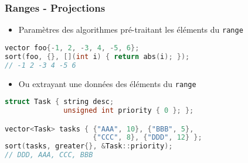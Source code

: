 \documentclass[C++.tex]{subfiles}
\begin{document}
\begin{frame}[fragile]
	\frametitle{Ranges - Projections}
	\begin{itemize}
		\item Paramètres des algorithmes pré-traitant les éléments du \lstinline|range|
	\end{itemize}

	\begin{lstlisting}[language=C++]
vector foo{-1, 2, -3, 4, -5, 6};
sort(foo, {}, [](int i) { return abs(i); }); 
// -1 2 -3 4 -5 6\end{lstlisting}


	\begin{itemize}
		\item Ou extrayant une données des éléments du \lstinline|range|
	\end{itemize}

	\begin{lstlisting}[language=C++]
struct Task { string desc;
              unsigned int priority { 0 }; };

vector<Task> tasks { {"AAA", 10}, {"BBB", 5}, 
                     {"CCC", 8}, {"DDD", 12} };
sort(tasks, greater{}, &Task::priority);
// DDD, AAA, CCC, BBB\end{lstlisting}
\end{frame}
\end{document}
